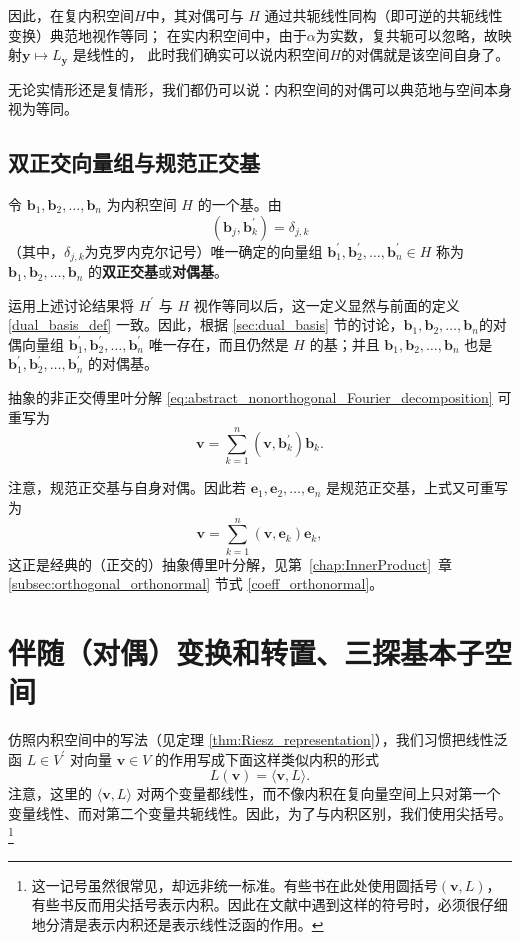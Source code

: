 因此，在复内积空间$H$中，其对偶可与 $H$ 通过共轭线性同构（即可逆的共轭线性变换）典范地视作等同；
在实内积空间中，由于$\alpha$为实数，复共轭可以忽略，故映射$\mathbf{y}\mapsto L_{\mathbf{y}}$ 是线性的，
此时我们确实可以说内积空间$H$的对偶就是该空间自身了。

无论实情形还是复情形，我们都仍可以说：内积空间的对偶可以典范地与空间本身视为等同。

\subsection{双正交向量组与规范正交基}\label{sec:dual_and_orthonormal_basis}

\begin{definition}
    令 $\mathbf{b}_1,\mathbf{b}_2,\ldots,\mathbf{b}_n$ 为内积空间 $H$ 的一个基。由
    \[
        (\mathbf{b}_j,\mathbf{b}_k^\prime)=\delta_{j,k}
    \]
    （其中，$\delta_{j,k}$为克罗内克尔记号）唯一确定的向量组
    $\mathbf{b}_1^\prime,\mathbf{b}_2^\prime,\ldots,\mathbf{b}_n^\prime\in H$
    称为 $\mathbf{b}_1,\mathbf{b}_2,\ldots,\mathbf{b}_n$ 的{\bf 双正交基}或{\bf 对偶基}。
\end{definition}

运用上述讨论结果将 $H^\prime$ 与 $H$ 视作等同以后，这一定义显然与前面的定义 \ref{dual_basis_def} 一致。因此，根据 \ref{sec:dual_basis} 节的讨论，$\mathbf{b}_1,\mathbf{b}_2,\ldots,\mathbf{b}_n$的对偶向量组
$\mathbf{b}_1^\prime,\mathbf{b}_2^\prime,\ldots,\mathbf{b}_n^\prime$
唯一存在，而且仍然是 $H$ 的基；并且
$\mathbf{b}_1,\mathbf{b}_2,\ldots,\mathbf{b}_n$ 也是
$\mathbf{b}_1^\prime,\mathbf{b}_2^\prime,\ldots,\mathbf{b}_n^\prime$ 的对偶基。

抽象的非正交傅里叶分解 \eqref{eq:abstract_nonorthogonal_Fourier_decomposition} 可重写为
\[
    \mathbf{v}
    =\sum_{k=1}^n(\mathbf{v},\mathbf{b}_k^\prime)\mathbf{b}_k.
\]

注意，规范正交基与自身对偶。因此若
$\mathbf{e}_1,\mathbf{e}_2,\ldots,\mathbf{e}_n$ 是规范正交基，上式又可重写为
\[
    \mathbf{v}
    =\sum_{k=1}^n(\mathbf{v},\mathbf{e}_k)\mathbf{e}_k,
\]
这正是经典的（正交的）抽象傅里叶分解，见第~\ref{chap:InnerProduct}~章 \ref{subsec:orthogonal_orthonormal} 节式 \eqref{coeff_orthonormal}。

\section{伴随（对偶）变换和转置、三探基本子空间}

仿照内积空间中的写法（见定理 \ref{thm:Riesz_representation}），我们习惯把线性泛函 $L\in V^\prime$ 对向量 $\mathbf{v}\in V$ 的作用写成下面这样类似内积的形式
\[
    L(\mathbf{v})=\langle\mathbf{v},L\rangle.
\]
注意，这里的 $\langle\mathbf{v},L\rangle$ 对两个变量都线性，而不像内积在复向量空间上只对第一个变量线性、而对第二个变量共轭线性。因此，为了与内积区别，我们使用尖括号。\footnote{这一记号虽然很常见，却远非统一标准。有些书在此处使用圆括号$(\mathbf{v},L)$，有些书反而用尖括号表示内积。因此在文献中遇到这样的符号时，必须很仔细地分清是表示内积还是表示线性泛函的作用。}


